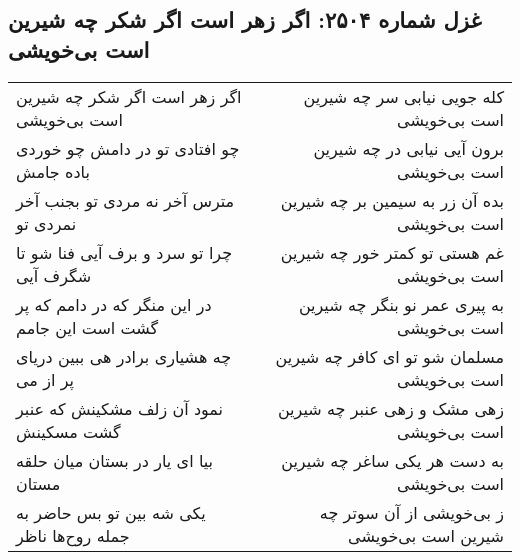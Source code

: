 \begin{center}
\section*{غزل شماره ۲۵۰۴: اگر زهر است اگر شکر چه شیرین است بی‌خویشی}
\label{sec:2504}
\begin{longtable}{l p{0.5cm} r}
اگر زهر است اگر شکر چه شیرین است بی‌خویشی
&&
کله جویی نیابی سر چه شیرین است بی‌خویشی
\\
چو افتادی تو در دامش چو خوردی باده جامش
&&
برون آیی نیابی در چه شیرین است بی‌خویشی
\\
مترس آخر نه مردی تو بجنب آخر نمردی تو
&&
بده آن زر به سیمین بر چه شیرین است بی‌خویشی
\\
چرا تو سرد و برف آیی فنا شو تا شگرف آیی
&&
غم هستی تو کمتر خور چه شیرین است بی‌خویشی
\\
در این منگر که در دامم که پر گشت است این جامم
&&
به پیری عمر نو بنگر چه شیرین است بی‌خویشی
\\
چه هشیاری برادر هی ببین دریای پر از می
&&
مسلمان شو تو ای کافر چه شیرین است بی‌خویشی
\\
نمود آن زلف مشکینش که عنبر گشت مسکینش
&&
زهی مشک و زهی عنبر چه شیرین است بی‌خویشی
\\
بیا ای یار در بستان میان حلقه مستان
&&
به دست هر یکی ساغر چه شیرین است بی‌خویشی
\\
یکی شه بین تو بس حاضر به جمله روح‌ها ناظر
&&
ز بی‌خویشی از آن سوتر چه شیرین است بی‌خویشی
\\
\end{longtable}
\end{center}

